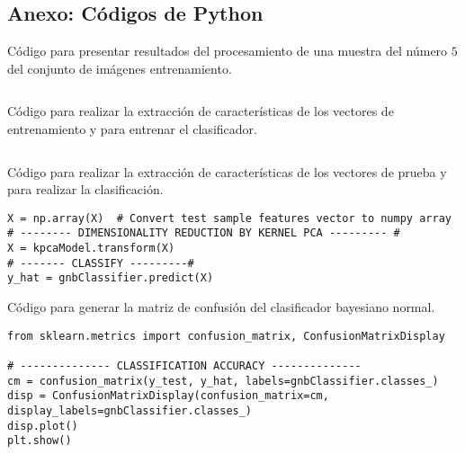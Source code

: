 
\begin{appendix}

\chapter{Anexo: Códigos de Python}

\begin{code}
	\caption{Código para presentar resultados del procesamiento de una muestra del número $5$ del conjunto de imágenes entrenamiento.}
	\label{code:test_samples_code}
	\centering
	\inputminted{python}{3_Reconocimiento/Codes/image_processing_test.py}
\end{code}

\begin{code}
	\caption{Código para realizar la extracción de características de los vectores de entrenamiento y para entrenar el clasificador.}
	\label{code:features_extracting}
	\centering
	\inputminted{python}{3_Reconocimiento/Codes/features_extracting.py}
\end{code}

\begin{code}
\caption{Código para realizar la extracción de características de los vectores de prueba y para realizar la clasificación.}
\label{code:sample_classifying}
\centering
\begin{verbatim}
X = np.array(X)  # Convert test sample features vector to numpy array
# -------- DIMENSIONALITY REDUCTION BY KERNEL PCA --------- #
X = kpcaModel.transform(X)
# ------- CLASSIFY ---------#
y_hat = gnbClassifier.predict(X)

\end{verbatim}
\end{code}

\begin{code}
\caption{Código para generar la matriz de confusión del clasificador bayesiano normal.}
\label{code:confusion_matrix}
\centering
\begin{verbatim}
from sklearn.metrics import confusion_matrix, ConfusionMatrixDisplay

# -------------- CLASSIFICATION ACCURACY --------------
cm = confusion_matrix(y_test, y_hat, labels=gnbClassifier.classes_)
disp = ConfusionMatrixDisplay(confusion_matrix=cm, display_labels=gnbClassifier.classes_)
disp.plot()
plt.show()
\end{verbatim}
\end{code}

\end{appendix}